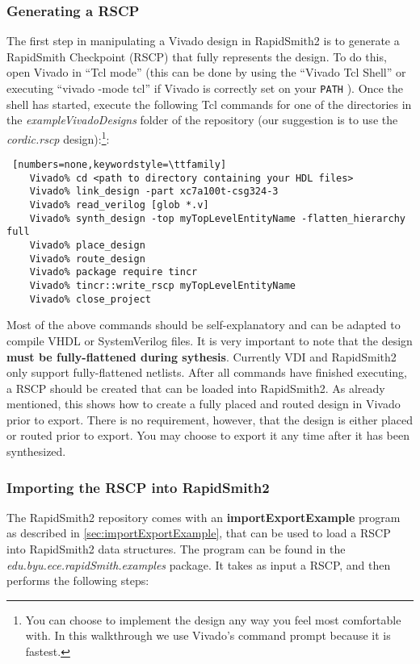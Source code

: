 \subsubsection{Generating a RSCP}  
The first step in manipulating a Vivado design in RapidSmith2 is to generate a
RapidSmith Checkpoint (RSCP) that fully represents the design. To do this, open
Vivado in ``Tcl mode'' (this can be done by using the ``Vivado Tcl Shell'' or
executing ``vivado -mode tcl'' if Vivado is correctly set on your \texttt{PATH}
). Once the shell has started, execute the following Tcl commands
for one of the directories in the \textit{exampleVivadoDesigns}
folder of the repository (our suggestion is to use the
\textit{cordic.rscp} design):\footnote{You can choose to implement the design
any way you feel most comfortable with. In this walkthrough we use Vivado's
command prompt because it is fastest.}:
                
\begin{lstlisting} [numbers=none,keywordstyle=\ttfamily]
	Vivado% cd <path to directory containing your HDL files>
	Vivado% link_design -part xc7a100t-csg324-3
	Vivado% read_verilog [glob *.v]
	Vivado% synth_design -top myTopLevelEntityName -flatten_hierarchy full 
	Vivado% place_design
	Vivado% route_design
	Vivado% package require tincr
	Vivado% tincr::write_rscp myTopLevelEntityName
	Vivado% close_project
\end{lstlisting}
Most of the above commands should be self-explanatory and can be adapted to
compile VHDL or SystemVerilog files.
It is very important to note that the design \textbf{must be fully-flattened
during sythesis}. Currently VDI and RapidSmith2 only support fully-flattened
netlists. After all commands have finished executing, a RSCP should be created
that can be loaded into RapidSmith2. As already mentioned, this shows how to
create a fully placed and routed design in Vivado prior to export.  There is no
requirement, however, that the design is either placed or routed prior to
export. You may choose to export it any time after it has been synthesized.

\subsubsection{Importing the RSCP into RapidSmith2}
The RapidSmith2 repository comes with an \textbf{importExportExample} program as
described in \autoref{sec:importExportExample}, that can be used to load a RSCP
into RapidSmith2 data structures. The program can be found in the
\textit{edu.byu.ece.rapidSmith.exa\-mples} package. It takes as input a RSCP,
and then performs the following steps:

